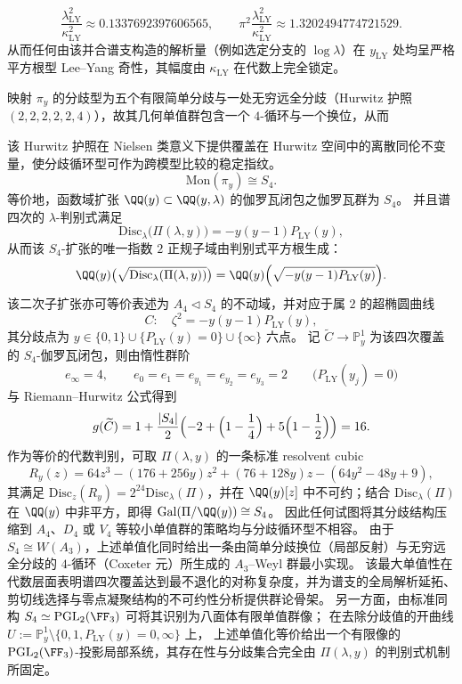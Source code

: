 \begin{theorem}
\[\frac{\lambda_{\mathrm{LY}}^{2}}{\kappa_{\mathrm{LY}}^{2}}\approx 0.1337692397606565,\qquad
\pi^{2}\frac{\lambda_{\mathrm{LY}}^{2}}{\kappa_{\mathrm{LY}}^{2}}\approx 1.3202494774721529.
\]
从而任何由该并合谱支构造的解析量（例如选定分支的 \(\log\lambda\)）在 \(y_{\mathrm{LY}}\) 处均呈严格平方根型 Lee--Yang 奇性，其幅度由 \(\kappa_{\mathrm{LY}}\) 在代数上完全锁定。
\par
映射 \(\pi_y\) 的分歧型为五个有限简单分歧与一处无穷远全分歧（Hurwitz 护照 \((2,2,2,2,2,4)\)），故其几何单值群包含一个 \(4\)-循环与一个换位，从而
\par
该 Hurwitz 护照在 Nielsen 类意义下提供覆盖在 Hurwitz 空间中的离散同伦不变量，使分歧循环型可作为跨模型比较的稳定指纹。
\[
\mathrm{Mon}(\pi_y)\cong S_4.
\]
等价地，函数域扩张 \(\QQ(y)\subset \QQ(y,\lambda)\) 的伽罗瓦闭包之伽罗瓦群为 \(S_4\)。
并且谱四次的 \(\lambda\)-判别式满足
\[
\mathrm{Disc}_{\lambda}\bigl(\Pi(\lambda,y)\bigr)=-y(y-1)P_{\mathrm{LY}}(y),
\]
从而该 \(S_4\)-扩张的唯一指数 \(2\) 正规子域由判别式平方根生成：
\[
\QQ(y)\bigl(\sqrt{\mathrm{Disc}_{\lambda}(\Pi(\lambda,y))}\bigr)
=\QQ(y)\Bigl(\sqrt{-y(y-1)P_{\mathrm{LY}}(y)}\Bigr).
\]
该二次子扩张亦可等价表述为 \(A_4\triangleleft S_4\) 的不动域，并对应于属 \(2\) 的超椭圆曲线
\[
C:\quad \zeta^{2}=-y(y-1)P_{\mathrm{LY}}(y),
\]
其分歧点为 \(y\in\{0,1\}\cup\{P_{\mathrm{LY}}(y)=0\}\cup\{\infty\}\) 六点。
记 \(\widetilde{C}\to\mathbb P^1_y\) 为该四次覆盖的 \(S_4\)-伽罗瓦闭包，则由惰性群阶
\[
e_\infty=4,\qquad e_0=e_1=e_{y_1}=e_{y_2}=e_{y_3}=2
\qquad\bigl(P_{\mathrm{LY}}(y_j)=0\bigr)
\]
与 Riemann--Hurwitz 公式得到
\[
g(\widetilde{C})
=1+\frac{|S_4|}{2}\Bigl(-2+\Bigl(1-\frac14\Bigr)+5\Bigl(1-\frac12\Bigr)\Bigr)
=16.
\]
作为等价的代数判别，可取 \(\Pi(\lambda,y)\) 的一条标准 resolvent cubic
\[
R_y(z)=64 z^3-(176+256y) z^2+(76+128y)z-(64y^2-48y+9),
\]
其满足 \(\mathrm{Disc}_z(R_y)=2^{24}\mathrm{Disc}_{\lambda}(\Pi)\)，并在 \(\QQ(y)[z]\) 中不可约；结合 \(\mathrm{Disc}_{\lambda}(\Pi)\) 在 \(\QQ(y)\) 中非平方，即得 \(\mathrm{Gal}(\Pi/\QQ(y))\cong S_4\)。
因此任何试图将其分歧结构压缩到 \(A_4\)、\(D_4\) 或 \(V_4\) 等较小单值群的策略均与分歧循环型不相容。
由于 \(S_4\cong W(A_3)\)，上述单值化同时给出一条由简单分歧换位（局部反射）与无穷远全分歧的 \(4\)-循环（Coxeter 元）所生成的 \(A_3\)–Weyl 群最小实现。
该最大单值性在代数层面表明谱四次覆盖达到最不退化的对称复杂度，并为谱支的全局解析延拓、剪切线选择与零点凝聚结构的不可约性分析提供群论骨架。
另一方面，由标准同构 \(S_4\simeq \mathrm{PGL}_2(\FF_3)\) 可将其识别为八面体有限单值群像；
在去除分歧值的开曲线 \(U:=\mathbb P^1_y\setminus\{0,1,P_{\mathrm{LY}}(y)=0,\infty\}\) 上，
上述单值化等价给出一个有限像的 \(\mathrm{PGL}_2(\FF_3)\)-投影局部系统，其存在性与分歧集合完全由 \(\Pi(\lambda,y)\) 的判别式机制所固定。
\end{theorem}

